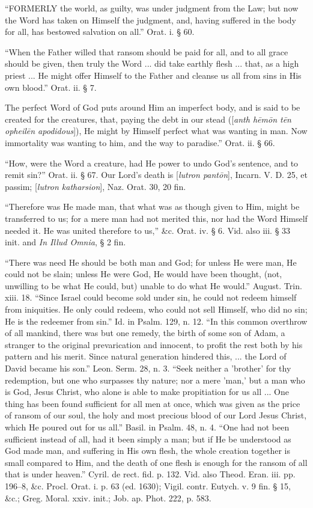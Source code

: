 ``FORMERLY
the world, as guilty, was under judgment from the Law; but now the
Word has taken on Himself the judgment, and, having suffered in the
body for all, has bestowed salvation on all.'' Orat. i. § 60.

``When the Father willed that ransom should be
paid for all, and to all grace should be given, then truly the Word
... did take earthly flesh ... that, as a high priest ... He might
offer Himself to the Father and cleanse us all from sins in His own
blood.'' Orat. ii. § 7.

The perfect Word of God puts around Him an
imperfect body, and is said to be created for the creatures, that,
paying the debt in our stead ([\emph{anth h\={e}m\={o}n t\={e}n
opheil\={e}n apodidous}]), He might by Himself perfect what was
wanting in man. Now immortality was wanting to him, and the way to
paradise.'' Orat. ii. § 66.

``How, were the Word a creature, had He power to
undo God's sentence, and to remit sin?'' Orat. ii. § 67. Our Lord's
death is [\emph{lutron pant\={o}n}],
Incarn. V. D. 25, et passim; [\emph{lutron katharsion}], Naz. Orat. 30, 20 fin.

``Therefore was He made man, that what was as
though given to Him, might be transferred to us; for a mere man had
not merited this, nor had the Word Himself needed it. He was
united therefore to us,'' \&c. Orat. iv. § 6. Vid. also iii. § 33
init. and \emph{In Illud Omnia},
§ 2 fin.

``There was need He should be both man and God;
for unless He were man, He could not be slain; unless He were God, He
would have been thought, (not, unwilling to be what He could, but)
unable to do what He would.'' August. Trin. xiii. 18. ``Since Israel
could become sold under sin, he could not redeem himself from
iniquities. He only could redeem, who could not sell Himself, who did
no sin; He is the redeemer from sin.'' Id. in Psalm. 129, n. 12. ``In
this common overthrow of all mankind, there was but one remedy, the
birth of some son of Adam, a stranger to the original prevarication
and innocent, to profit the rest both by his pattern and his merit.
Since natural generation hindered this, ... the Lord of David became
his son.'' Leon. Serm. 28, n. 3. ``Seek neither a 'brother' for thy
redemption, but one who surpasses thy nature; nor a mere 'man,' but a
man who is God, Jesus Christ, who alone is able to make propitiation
for us all ... One thing has been found sufficient for all men at
once, which was given as the price of ransom of our soul, the holy and
most precious blood of our Lord Jesus Christ, which He poured out for
us all.'' Basil. in Psalm. 48, n. 4. ``One had not been sufficient
instead of all, had it been simply a man; but if He be understood as
God made man, and suffering in His own flesh, the whole creation
together is small compared to Him, and the death of one flesh is
enough for the ransom of all that is under heaven.'' Cyril. de rect.
fid. p. 132. Vid. also Theod. Eran. iii. pp. 196–8, \&c.
Procl. Orat. i. p. 63 (ed. 1630); Vigil. contr. Eutych. v. 9 fin. §
15, \&c.; Greg. Moral. xxiv. init.; Job. ap. Phot. 222, p. 583.


